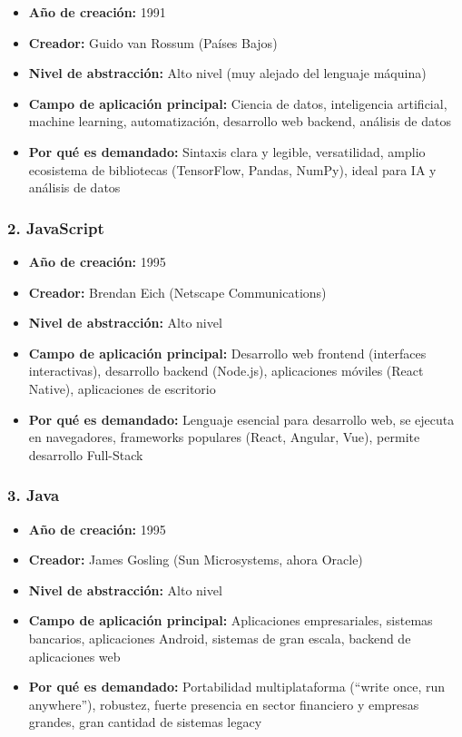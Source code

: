 \documentclass[12pt]{article}
\begin{document}
\begin{itemize}
    \item \textbf{Año de creación:} 1991
    \item \textbf{Creador:} Guido van Rossum (Países Bajos)
    \item \textbf{Nivel de abstracción:} Alto nivel (muy alejado del lenguaje máquina)
    \item \textbf{Campo de aplicación principal:} Ciencia de datos, inteligencia artificial, machine learning, automatización, desarrollo web backend, análisis de datos
    \item \textbf{Por qué es demandado:} Sintaxis clara y legible, versatilidad, amplio ecosistema de bibliotecas (TensorFlow, Pandas, NumPy), ideal para IA y análisis de datos
\end{itemize}

\subsubsection{2. JavaScript}

\begin{itemize}
    \item \textbf{Año de creación:} 1995
    \item \textbf{Creador:} Brendan Eich (Netscape Communications)
    \item \textbf{Nivel de abstracción:} Alto nivel
    \item \textbf{Campo de aplicación principal:} Desarrollo web frontend (interfaces interactivas), desarrollo backend (Node.js), aplicaciones móviles (React Native), aplicaciones de escritorio
    \item \textbf{Por qué es demandado:} Lenguaje esencial para desarrollo web, se ejecuta en navegadores, frameworks populares (React, Angular, Vue), permite desarrollo Full-Stack
\end{itemize}

\subsubsection{3. Java}

\begin{itemize}
    \item \textbf{Año de creación:} 1995
    \item \textbf{Creador:} James Gosling (Sun Microsystems, ahora Oracle)
    \item \textbf{Nivel de abstracción:} Alto nivel
    \item \textbf{Campo de aplicación principal:} Aplicaciones empresariales, sistemas bancarios, aplicaciones Android, sistemas de gran escala, backend de aplicaciones web
    \item \textbf{Por qué es demandado:} Portabilidad multiplataforma (``write once, run anywhere''), robustez, fuerte presencia en sector financiero y empresas grandes, gran cantidad de sistemas legacy
\end{itemize}
\end{document}
